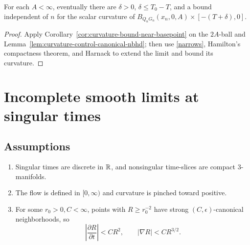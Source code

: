 \begin{claim}
\label{claim:uniform-curvature-bound-extended-interval}

For each $A<\infty$, eventually there are $\delta>0$, $\delta\le T_0-T$, and
a bound independent of $n$ for the scalar curvature of
$B_{Q_nG_n}(x_n,0,A)\times[-(T+\delta),0]$.
\end{claim}
\begin{proof}
\sketch Apply Corollary~\ref{cor:curvature-bound-near-basepoint} on the
$2A$-ball and Lemma~\ref{lem:curvature-control-canonical-nbhd}; then use
\ref{narrows}, Hamilton's compactness theorem, and Harnack to extend the
limit and bound its curvature.\end{proof}

\section{Incomplete smooth limits at singular times}
\subsection{Assumptions}
\begin{definition}
\label{def:standing-assumptions-singular-time}\label{assumptions}
\begin{enumerate}
\item[(a)] Singular times are discrete in $\mathbb{R}$, and nonsingular time-slices
are compact $3$-manifolds.
\item[(b)] The flow is defined in $[0,\infty)$ and curvature is pinched
toward positive.
\item[(c)] For some $r_0>0,C<\infty$, points with $R\ge r_0^{-2}$ have
strong $(C,\epsilon)$-canonical neighborhoods, so
$$\left|\frac{\partial R}{\partial t}\right|<CR^2,\qquad
|\nabla R|<CR^{3/2}.$$
\end{enumerate}
\end{definition}

